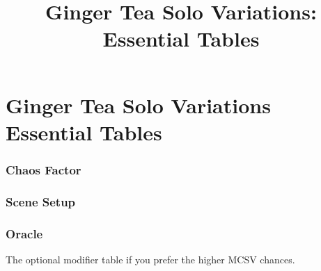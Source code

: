 

\title{Ginger Tea Solo Variations: Essential Tables}


\mainmatter
\chapter*{Ginger Tea Solo Variations\hspace*{8cm} Essential Tables \version}
\subsection{Chaos Factor}

\subsection{Scene Setup}


\newpage
\subsection{Oracle}


The optional modifier table if you prefer the higher MCSV chances.


